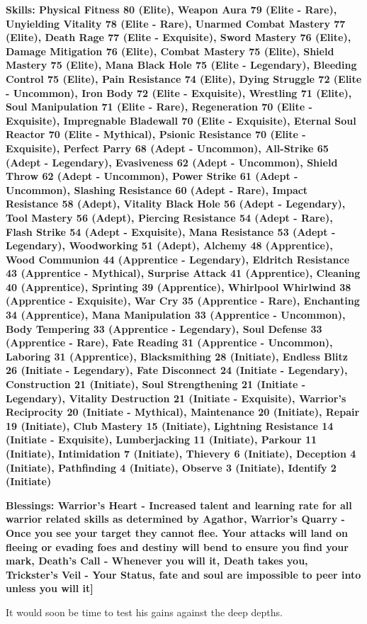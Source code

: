 \documentclass[a4paper,10pt]{book}
\begin{document}
\textbf{Skills: Physical Fitness 80 (Elite), Weapon Aura 79 (Elite - Rare), Unyielding Vitality 78 (Elite - Rare), Unarmed Combat Mastery 77 (Elite), Death Rage 77 (Elite - Exquisite), Sword Mastery 76 (Elite), Damage Mitigation 76 (Elite), Combat Mastery 75 (Elite), Shield Mastery 75 (Elite), Mana Black Hole 75 (Elite - Legendary), Bleeding Control 75 (Elite), Pain Resistance 74 (Elite), Dying Struggle 72 (Elite - Uncommon), Iron Body 72 (Elite - Exquisite), Wrestling 71 (Elite), Soul Manipulation 71 (Elite - Rare), Regeneration 70 (Elite - Exquisite), Impregnable Bladewall 70 (Elite - Exquisite), Eternal Soul Reactor 70 (Elite - Mythical), Psionic Resistance 70 (Elite - Exquisite), Perfect Parry 68 (Adept - Uncommon), All-Strike 65 (Adept - Legendary), Evasiveness 62 (Adept - Uncommon), Shield Throw 62 (Adept - Uncommon), Power Strike 61 (Adept - Uncommon), Slashing Resistance 60 (Adept - Rare), Impact Resistance 58 (Adept), Vitality Black Hole 56 (Adept - Legendary), Tool Mastery 56 (Adept), Piercing Resistance 54 (Adept - Rare), Flash Strike 54 (Adept - Exquisite), Mana Resistance 53 (Adept - Legendary), Woodworking 51 (Adept), Alchemy 48 (Apprentice), Wood Communion 44 (Apprentice - Legendary), Eldritch Resistance 43 (Apprentice - Mythical), Surprise Attack 41 (Apprentice), Cleaning 40 (Apprentice), Sprinting 39 (Apprentice), Whirlpool Whirlwind 38 (Apprentice - Exquisite), War Cry 35 (Apprentice - Rare), Enchanting 34 (Apprentice), Mana Manipulation 33 (Apprentice - Uncommon), Body Tempering 33 (Apprentice - Legendary), Soul Defense 33 (Apprentice - Rare), Fate Reading 31 (Apprentice - Uncommon), Laboring 31 (Apprentice), Blacksmithing 28 (Initiate), Endless Blitz 26 (Initiate - Legendary), Fate Disconnect 24 (Initiate - Legendary), Construction 21 (Initiate), Soul Strengthening 21 (Initiate - Legendary), Vitality Destruction 21 (Initiate - Exquisite), Warrior’s Reciprocity 20 (Initiate - Mythical), Maintenance 20 (Initiate), Repair 19 (Initiate), Club Mastery 15 (Initiate), Lightning Resistance 14 (Initiate - Exquisite), Lumberjacking 11 (Initiate), Parkour 11 (Initiate), Intimidation 7 (Initiate), Thievery 6 (Initiate), Deception 4 (Initiate), Pathfinding 4 (Initiate), Observe 3 (Initiate), Identify 2 (Initiate)}\par
\textbf{Blessings: Warrior’s Heart - Increased talent and learning rate for all warrior related skills as determined by Agathor, Warrior’s Quarry - Once you see your target they cannot flee. Your attacks will land on fleeing or evading foes and destiny will bend to ensure you find your mark, Death’s Call - Whenever you will it, Death takes you, Trickster’s Veil - Your Status, fate and soul are impossible to peer into unless you will it]}\par
It would soon be time to test his gains against the deep depths.\par
\end{document}
